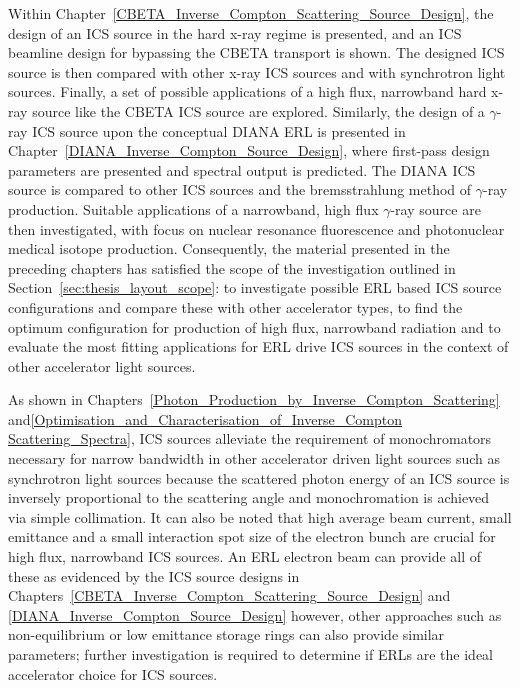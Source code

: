 \documentclass[../main.tex]{subfiles}
\begin{document}
Within Chapter~\ref{CBETA_Inverse_Compton_Scattering_Source_Design}, the design of an ICS source in the hard x-ray regime is presented, and an ICS beamline design for bypassing the CBETA transport is shown. The designed ICS source is then compared with other x-ray ICS sources and with synchrotron light sources. Finally, a set of possible applications of a high flux, narrowband hard x-ray source like the CBETA ICS source are explored. Similarly, the design of a $\gamma$-ray ICS source upon the conceptual DIANA ERL is presented in Chapter~\ref{DIANA_Inverse_Compton_Source_Design}, where first-pass design parameters are presented and spectral output is predicted. The DIANA ICS source is compared to other ICS sources and the bremsstrahlung method of $\gamma$-ray production. Suitable applications of a narrowband, high flux $\gamma$-ray source are then investigated, with focus on nuclear resonance fluorescence and photonuclear medical isotope production. Consequently, the material presented in the preceding chapters has satisfied the scope of the investigation outlined in Section~\ref{sec:thesis_layout_scope}: to investigate possible ERL based ICS source configurations and compare these with other accelerator types, to find the optimum configuration for production of high flux, narrowband radiation and to evaluate the most fitting applications for ERL drive ICS sources in the context of other accelerator light sources.

As shown in Chapters~\ref{Photon_Production_by_Inverse_Compton_Scattering} and\ref{Optimisation_and_Characterisation_of_Inverse_Compton Scattering_Spectra}, ICS sources alleviate the requirement of monochromators necessary for narrow bandwidth in other accelerator driven light sources such as synchrotron light sources because the scattered photon energy of an ICS source is inversely proportional to the scattering angle and monochromation is achieved via simple collimation. It can also be noted that high average beam current, small emittance and a small interaction spot size of the electron bunch are crucial for high flux, narrowband ICS sources. An ERL electron beam can provide all of these as evidenced by the ICS source designs in Chapters~\ref{CBETA_Inverse_Compton_Scattering_Source_Design} and \ref{DIANA_Inverse_Compton_Source_Design} however, other approaches such as non-equilibrium or low emittance storage rings can also provide similar parameters; further investigation is required to determine if ERLs are the ideal accelerator choice for ICS sources. 
\end{document}
